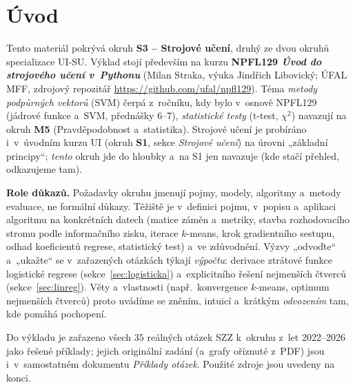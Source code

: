 \documentclass[11pt,a4paper]{article}
\begin{document}
\maketitle
\tableofcontents
\bigskip

\section*{Úvod}

Tento materiál pokrývá okruh \textbf{S3 -- Strojové učení}, druhý ze dvou okruhů specializace UI-SU. Výklad stojí především na kurzu \textbf{NPFL129 \emph{Úvod do strojového učení v~Pythonu}} (Milan Straka, výuka Jindřich Libovický; ÚFAL MFF, zdrojový repozitář \url{https://github.com/ufal/npfl129}). Téma \emph{metody podpůrných vektorů} (SVM) čerpá z~ročníku, kdy bylo v~osnově NPFL129 (jádrové funkce a~SVM, přednášky 6--7), \emph{statistické testy} (t-test, $\chi^2$) navazují na okruh \textbf{M5} (Pravděpodobnost a~statistika). Strojové učení je probíráno i~v~úvodním kurzu UI (okruh \textbf{S1}, sekce \emph{Strojové učení}) na úrovni „základní principy``; \emph{tento} okruh jde do hloubky a~na S1 jen navazuje (kde stačí přehled, odkazujeme tam).

\medskip
\noindent\textbf{Role důkazů.} Požadavky okruhu jmenují pojmy, modely, algoritmy a~metody evaluace, ne formální důkazy. Těžiště je v~definici pojmu, v~popisu a~aplikaci algoritmu na konkrétních datech (matice záměn a~metriky, stavba rozhodovacího stromu podle informačního zisku, iterace $k$-means, krok gradientního sestupu, odhad koeficientů regrese, statistický test) a~ve zdůvodnění. Výzvy „odvoďte`` a~„ukažte`` se v~zařazených otázkách týkají \emph{výpočtu}: derivace ztrátové funkce logistické regrese (sekce~\ref{sec:logisticka}) a~explicitního řešení nejmenších čtverců (sekce~\ref{sec:linreg}). Věty a~vlastnosti (např.\ konvergence $k$-means, optimum nejmenších čtverců) proto uvádíme se zněním, intuicí a~krátkým \emph{odvozením} tam, kde pomáhá pochopení.

Do výkladu je zařazeno všech $35$ reálných otázek SZZ k~okruhu z~let 2022--2026 jako řešené příklady; jejich originální zadání (a~grafy oříznuté z~PDF) jsou i~v~samostatném dokumentu \emph{Příklady otázek}. Použité zdroje jsou uvedeny na konci.
\end{document}
